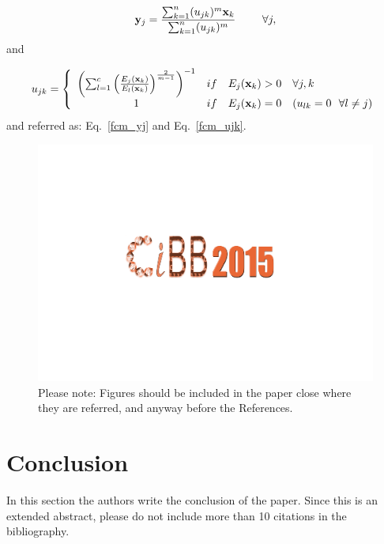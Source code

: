 \documentclass[12pt,a4paper]{cibb}
\begin{document}
\begin{equation}
{\bf y}_{j} = \frac {\sum_{k=1}^{n} (u_{jk})^{m}{\bf x}_{k} }{
\sum_{k=1}^{n} ({ u}_{jk})^{m} } \, \, \ \mbox{\hspace{.5cm}  } \forall j,
\label{fcm_yj}
\end{equation}
and

\begin{equation}
u_{jk} =
\left\{
\begin{array}{clll}
\left( \sum_{l=1}^{c} \left( \frac {E_{j}({\bf x}_{k})}{E_{l}({\bf x}_{k})}
\right)^\frac{2}{m-1} \right)^{-1} & if & E_{j}({\bf x}_{k})>0 & \forall j,k \\
1 & if & E_{j}({\bf x}_{k})=0 & (u_{lk}=0 \ \ \forall l \neq j) \\
\end{array}
\right.
\label{fcm_ujk}
\end{equation}
and referred as: Eq.~\ref{fcm_yj} and Eq.~\ref{fcm_ujk}.

\begin{figure}[h]
\vspace{3mm}
 \begin{center}
 \includegraphics[width=12cm]{logo.pdf}
\caption {Please note: Figures should be
included in the paper close where they are referred, and anyway before the
References.\label{cibb-fig}}
 \end{center}
\vspace{-8mm}
\end{figure}

\section{\bf Conclusion}

In this section the authors write the conclusion of the paper. Since this is an extended abstract, please do not include more than 10 citations in the bibliography.
\end{document}
